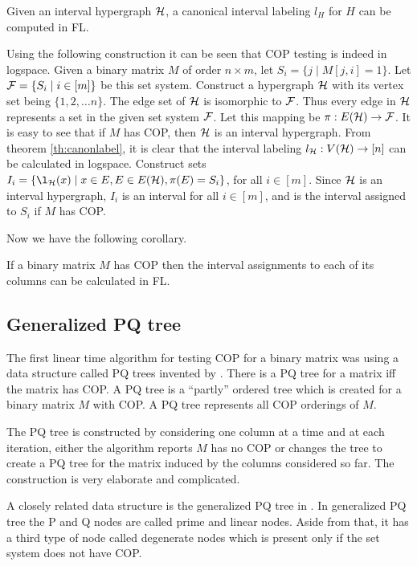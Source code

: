 \documentclass{llncs}
\def\cF{{\cal F}}
\def\cH{{\cal H}}
\begin{document}
\begin{theorem} 
\label{th:canonlabel}
Given an interval hypergraph $\cH$, a canonical interval labeling $l_H$ 
for $H$ can be computed in FL.
\end{theorem}


Using the following construction it can be seen that COP testing is
indeed in logspace. Given a binary matrix $M$ of order $n \times m$,
let $S_i = \{j \mid M[j,i]=1 \}$. Let $\cF = \{S_i \mid i \in [m] \}$
be this set system. Construct a hypergraph $\cH$ with its vertex set
being $\{1, 2, \dots n\}$. The edge set of $\cH$ is isomorphic to
$\cF$. Thus every edge in $\cH$ represents a set in the given set
system $\cF$. Let this mapping be $\pi: E(\cH) \rightarrow \cF$. It is
easy to see that if $M$ has COP, then $\cH$ is an interval
hypergraph. From theorem \ref{th:canonlabel}, it is clear that the
interval labeling $l_{\cH}: V(\cH) \rightarrow [n]$ can be calculated
in logspace. Construct sets $I_i = \{ \l_{\cH}(x) \mid x \in E, E \in
E(\cH), \pi(E) = S_i\}$, for all $i \in [m]$. Since $\cH$ is an
interval hypergraph, $I_i$ is an interval for all $i \in [m]$, and is
the interval assigned to $S_i$ if $M$ has COP.

Now we have the following corollary.
\begin{corollary}
\label{cor:coplog}
  If a binary matrix $M$ has COP then the interval assignments to each
  of its columns can be calculated in FL.
\end{corollary}


\subsection{Generalized PQ tree}
The first linear time algorithm for testing COP for a binary matrix
was using a data structure called PQ trees invented by
\cite{bl76}. There is a PQ tree for a matrix iff the matrix has COP.
A PQ tree is a ``partly'' ordered tree which is created for a
binary matrix $M$ with COP. 
A PQ tree represents all COP orderings of $M$. 

The PQ tree is constructed by considering one column at a time and at
each iteration, either the algorithm reports $M$ has no COP or changes
the tree to create a PQ tree for the matrix induced by the columns
considered so far. The construction is very elaborate and complicated.

A closely related data structure is the generalized PQ tree in
\cite{mcc04}. 
In generalized PQ tree the P and Q nodes are called prime and linear
nodes. Aside from that, it has a third type of node called degenerate
nodes which is present only if the set system does not have COP.
\end{document}
